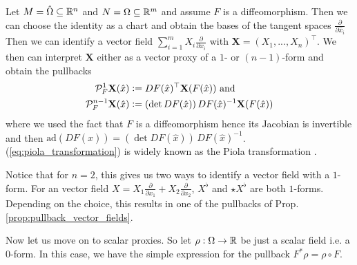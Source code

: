 \documentclass[../master_thesis.tex]{subfiles}
\begin{document}
Let $M = \hat{\Omega} \subseteq \mathbb{R}^n$ and $N = \Omega \subseteq \mathbb{R}^m$ and assume 
$F$ is a diffeomorphism. Then we can choose the identity as a chart and obtain 
the bases of the tangent spaces $\frac{\partial}{\partial \hat{x}_i}$
Then we 
can identify a vector field $\sum_{i=1}^m X_i \frac{\partial}{\partial x_i}$
with $\mathbf{X} = (X_1,...,X_n)^\top$. We then can interpret $\mathbf{X}$ 
either as a vector proxy of a $1$- or $(n-1)$-form and obtain the pullbacks
\begin{align}
    \mathcal{P}^1_F \mathbf{X}(\hat{x}) &\vcentcolon= DF(\hat{x})^\top \mathbf{X}(F(\hat{x})) \text{ and} \notag
    \\ \mathcal{P}^{n-1}_F \mathbf{X}(\hat{x}) &\vcentcolon= (\det DF(\hat{x}))\,
        DF(\hat{x})^{-1} \mathbf{X}(F(\hat{x}))\label{eq:piola_transformation}
\end{align}
where we used the fact that $F$ is a diffeomorphism hence its Jacobian 
is invertible and then $\text{ad}(DF(\hat{x})) = (\det DF(\hat{x}))\,
DF(\hat{x})^{-1}$.
(\ref{eq:piola_transformation}) is widely known as the Piola transformation \cite[Def.\,9.8]{ern_guermond}.

\begin{remark}\label{rem:vector_proxies_differential_forms_2d}
    Notice that for $n=2$, this gives us two ways to identify a vector field with a $1$-form. 
    For an vector field $X = X_1 \frac{\partial}{\partial x_1} + X_2 \frac{\partial}{\partial x_2}$, 
    $X^\flat$ and $\star X^\flat$ are both $1$-forms. 
    Depending on the choice, this results in one of the pullbacks of 
    Prop.\,\ref{prop:pullback_vector_fields}.
\end{remark}

Now let us move on to scalar proxies. So let $\rho: \Omega \rightarrow \mathbb{R}$ be 
just a scalar field i.e. a $0$-form. In this case, we 
have the simple expression for the pullback $F^* \rho = \rho \circ F$. 
\end{document}
